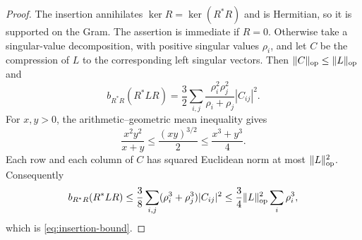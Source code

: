 \begin{proof}
The insertion annihilates $\ker R=\ker(R^*R)$ and is Hermitian,
so it is supported on the Gram.  The assertion is immediate if
$R=0$.  Otherwise take a singular-value decomposition, with positive
singular values $\rho_i$, and let $C$ be the compression of $L$ to
the corresponding left singular vectors.  Then
$\lVert C\rVert_{\mathrm{op}}\le\lVert L\rVert_{\mathrm{op}}$ and
\[
 b_{R^*R}(R^*LR)
 =\frac32\sum_{i,j}
   \frac{\rho_i^2\rho_j^2}{\rho_i+\rho_j}|C_{ij}|^2.
\]
For $x,y>0$, the arithmetic--geometric mean inequality gives
\[
 \frac{x^2y^2}{x+y}
 \le\frac{(xy)^{3/2}}2
 \le\frac{x^3+y^3}4.
\]
Each row and each column of $C$ has squared Euclidean norm at most
$\lVert L\rVert_{\mathrm{op}}^2$.  Consequently
\[
 b_{R^*R}(R^*LR)
 \le\frac38\sum_{i,j}(\rho_i^3+\rho_j^3)|C_{ij}|^2
 \le\frac34\lVert L\rVert_{\mathrm{op}}^2\sum_i\rho_i^3,
\]
which is \eqref{eq:insertion-bound}.
\end{proof}

